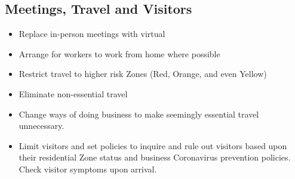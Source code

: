 \documentclass[onecolumn,journal]{IEEEtran}
\begin{document}
\begin{multicols}{2}
\section*{Meetings, Travel and Visitors}
\begin{itemize}
    \item Replace in-person meetings with virtual
    \item Arrange for workers to work from home where possible
    \item Restrict travel to higher risk Zones (Red, Orange, and even Yellow)
    \item Eliminate non-essential travel
    \item Change ways of doing business to make seemingly essential travel unnecessary.
    \item Limit visitors and set policies to inquire and rule out visitors based upon their residential Zone status and business Coronavirus prevention policies. Check visitor symptoms upon arrival. 
\end{itemize}
   

\end{multicols}
\end{document}
